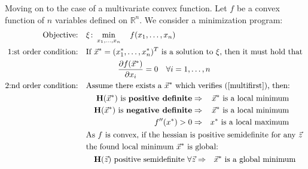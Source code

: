 \documentclass[../convex_optimization.tex]{subfiles}
\theoremstyle{definition} \newtheorem{defi}{Def}
\theoremstyle{definition} \newtheorem{prop}{Prop}
\begin{document}
Moving on to the case of a multivariate convex function.
Let $f$ be a convex function of $n$ variables defined on $\mathbb R^n$.
We consider a minimization program:
\begin{align}
    \text{Objective:} &\quad\xi\colon \min_{x_1,\ldots,x_n}
    \quad f(x_1, \ldots, x_n)
    \nonumber\\
    \text{1:st order condition:} &\quad
    \text{If $\vec{x}^*=(x_1^*, \ldots, x_n^*)^T$ is a solution to $\xi$,
    then it must hold that }
    \nonumber\\& \qquad \qquad \quad
    \begin{aligned}
        \frac{\partial f(\vec{x}^*)}{\partial x_i} = 0\label{multifirst}
        \quad \forall i=1,\ldots , n
    \end{aligned}\\
    \text{2:nd order condition:} &\quad
    \text{Assume there exists a $\vec{x}^*$ which verifies (\ref{multifirst}), then:}
    \nonumber\\ & \qquad
    \begin{aligned}
        \mathbf H(\vec{x}^*) \text{ is \textbf{positive definite}}
        &\Rightarrow & \vec{x}^*\text{ is a local minimum}\\
        \mathbf H(\vec{x}^*) \text{ is \textbf{negative definite}}
        &\Rightarrow & \vec{x}^*\text{ is a local minimum}\\
        f''(x^*) > 0 &\Rightarrow & x^* \text{ is a local maximum}
    \end{aligned}\\
    &\quad
    \text{As $f$ is convex, if the hessian is positive semidefinite for
any $\vec{z}$}\nonumber \\ & \quad
    \text{the found local minimum $\vec{x}^*$ is global:}
    \nonumber\\ & \qquad
    \begin{aligned}
        \mathbf H(\vec{z}) \text{ positive semidefinite } \forall \vec{z}
        & \Rightarrow & \vec{x}^*\text{ is a global minimum}
    \end{aligned}
\end{align}
\end{document}
